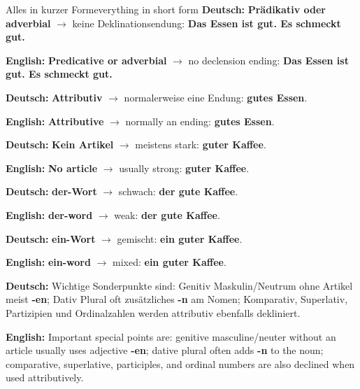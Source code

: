 \documentclass[a4paper,11pt]{article}
\newcommand{\GermanText}[1]{\textbf{Deutsch: }#1\par}
\newcommand{\EnglishText}[1]{{\small\color{SoftGray}\textbf{English: }#1\par}}
\begin{document}
\begin{grammarentry}{Alles in kurzer Form}{everything in short form}
\GermanText{\textbf{Prädikativ oder adverbial} $\rightarrow$ keine Deklinationsendung: \textbf{Das Essen ist gut. Es schmeckt gut.}}
\EnglishText{\textbf{Predicative or adverbial} $\rightarrow$ no declension ending: \textbf{Das Essen ist gut. Es schmeckt gut.}}

\GermanText{\textbf{Attributiv} $\rightarrow$ normalerweise eine Endung: \textbf{gutes Essen}.}
\EnglishText{\textbf{Attributive} $\rightarrow$ normally an ending: \textbf{gutes Essen}.}

\GermanText{\textbf{Kein Artikel} $\rightarrow$ meistens stark: \textbf{guter Kaffee}.}
\EnglishText{\textbf{No article} $\rightarrow$ usually strong: \textbf{guter Kaffee}.}

\GermanText{\textbf{der-Wort} $\rightarrow$ schwach: \textbf{der gute Kaffee}.}
\EnglishText{\textbf{der-word} $\rightarrow$ weak: \textbf{der gute Kaffee}.}

\GermanText{\textbf{ein-Wort} $\rightarrow$ gemischt: \textbf{ein guter Kaffee}.}
\EnglishText{\textbf{ein-word} $\rightarrow$ mixed: \textbf{ein guter Kaffee}.}

\GermanText{Wichtige Sonderpunkte sind: Genitiv Maskulin/Neutrum ohne Artikel meist \textbf{-en}; Dativ Plural oft zusätzliches \textbf{-n} am Nomen; Komparativ, Superlativ, Partizipien und Ordinalzahlen werden attributiv ebenfalls dekliniert.}
\EnglishText{Important special points are: genitive masculine/neuter without an article usually uses adjective \textbf{-en}; dative plural often adds \textbf{-n} to the noun; comparative, superlative, participles, and ordinal numbers are also declined when used attributively.}
\end{grammarentry}
\end{document}
